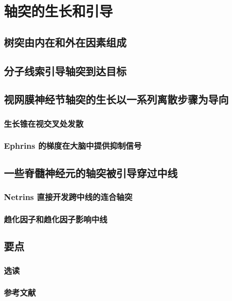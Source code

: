 \chapter{轴突的生长和引导}


\section{树突由内在和外在因素组成}

\section{分子线索引导轴突到达目标}

\section{视网膜神经节轴突的生长以一系列离散步骤为导向}
\subsection{生长锥在视交叉处发散}
\subsection{Ephrins 的梯度在大脑中提供抑制信号}

\section{一些脊髓神经元的轴突被引导穿过中线}
\subsection{Netrins 直接开发跨中线的连合轴突}
\subsection{趋化因子和趋化因子影响中线}

\section{要点}
\subsection{选读}
\subsection{参考文献}
